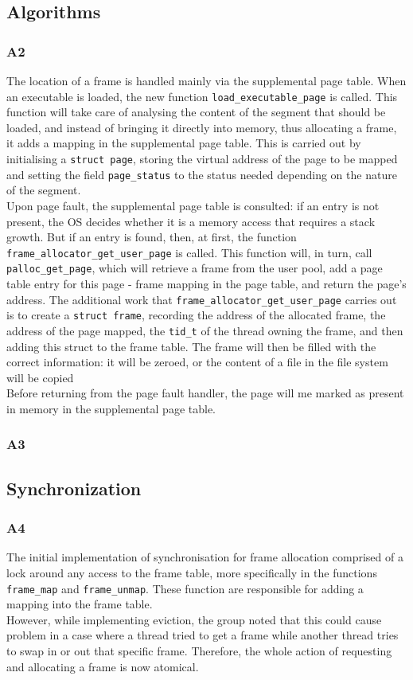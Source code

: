 \documentclass[a4wide, 11pt]{article}
\newcommand{\tx}{\texttt}
\begin{document}
 

\subsection{Algorithms}
\subsubsection{A2}
The location of a frame is handled mainly via the supplemental page table.
When an executable is loaded, the new function \tx{load\_executable\_page} is called. This function will take care of analysing the content of the segment that should be loaded, and instead of bringing it directly into memory, thus allocating a frame, it adds a mapping in the supplemental page table. This is carried out by initialising a \tx{struct page}, storing the virtual address of the page to be mapped and   setting the field \tx{page\_status} to the status needed depending on the nature of the segment. \\
Upon page fault, the supplemental page table is consulted: if an entry is not present, the OS decides whether it is a memory access that requires a stack growth. But if an entry is found, then, at first, the function \tx{frame\_allocator\_get\_user\_page} is called. This function will, in turn, call \tx{palloc\_get\_page}, which will retrieve a frame from the user pool, add a page table entry for this page - frame mapping in the page table, and return the page's address. The additional work that \tx{frame\_allocator\_get\_user\_page} carries out is to create a \tx{struct frame}, recording the address of the allocated frame, the address of the page  mapped, the \tx{tid\_t} of the thread owning the frame, and then adding this struct to the frame table. The frame will then be filled with the correct information: it will be zeroed, or the content of a file in the file system will be copied \\
Before returning from the page fault handler, the page will me marked as present in memory in the supplemental page table.
\subsubsection{A3}

\subsection{Synchronization}
\subsubsection{A4}
The initial implementation of synchronisation for frame allocation comprised of a lock around any access to the frame table, more specifically in the functions \tx{frame\_map} and \tx{frame\_unmap}. These function are responsible for adding a mapping into the frame table. \\
However, while implementing eviction, the group noted that this could cause problem in a case where a thread tried to get a frame while another thread tries to swap in or out that specific frame. Therefore, the whole action of requesting and allocating a frame is now atomical.
\end{document}

